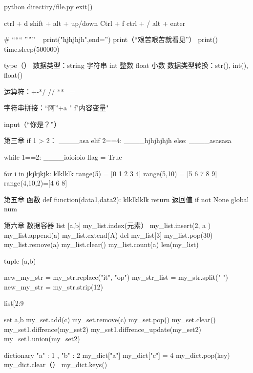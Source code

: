 python directiry/file.py %
exit()  %

ctrl + d %
shift + alt + up/down %
Ctrl + f %
ctrl + / %
alt + enter %

#  %
“““     ”””   %
\ %
print("hjhjhjh",end='')  %
print（“艰苦艰苦就看见”）  %
print()  %
time.sleep(500000) %

type（）  %
数据类型：string 字符串
          int    整数
          float  小数
数据类型转换：str(), int(), float()

运算符：+-*/  // %
              ** %
              ~= %

字符串拼接：“阿”+a 
            "  %
            f"内容{变量}"   %

input（“你是？”）  %


第三章
if 1 > 2：
____asa
elif 2==4:
____hjhjhjhjh
else:
____asasasa

while 1==2:
____ioioioio
flag = True

for i in jkjkjkjk:
    klklklk
range(5) = [0 1 2 3 4]
range(5,10) = [5 6 7 8 9]
range(4,10,2)=[4 6 8]

第五章 函数
def function(data1,data2):
    klklklklk
    return 返回值
if not None %
global num  %

第六章  数据容器
list  [a,b]
my_list.index(元素） %
my_list.insert(2, a )  %
my_list.append(a)  %
my_list.extend(A)  %
del my_list[3]    %
my_list.pop(30)   %
my_list.remove(a)   %
my_list.clear()   %
my_list.count(a)   %
len(my_list)    %

tuple (a,b)  %

new_my_str = my_str.replace("it", "op")  %
my_str_list = my_str.split(" ")  %
new_my_str = my_str.strip(12)  %

list[2:9%

set {a,b}  %
my_set.add(c)  %
my_set.remove(c)  %
my_set.pop()  %
my_set.clear()  %
my_set1.diffrence(my_set2) %
my_set1.diffrence_update(my_set2) %
my_set1.union(my_set2) %

dictionary  {"a" : 1 , "b" : 2}  %
my_dict["a"] %
my_dict["c"] = 4  %
my_dict.pop(key)  %
my_dict.clear（）
my_dict.keys()  %


